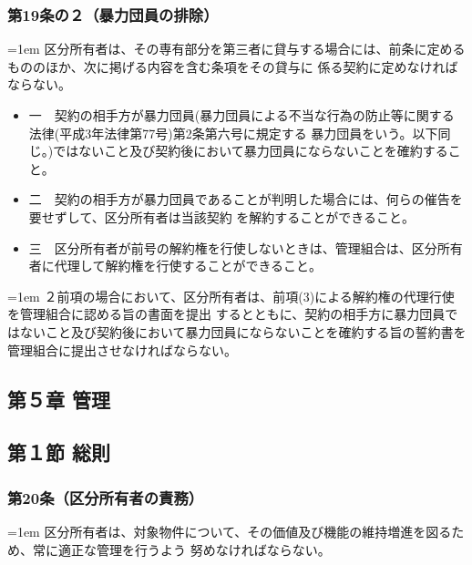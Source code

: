 \documentclass[
  twoside,
  luatex,
  paper=a4paper,
  fontsize=11pt,
  jafontsize=11pt,
  jlreq_notes,
]{jlreq}
\newcommand{\joumain}[1]{%
  \noindent\hangindent=1em\hangafter=1
  \hspace{1em}#1%
}
\newcommand{\kou}[2]{%
  \par\noindent\hangindent=1em\hangafter=1
  #1\hspace{1em}#2%
}
\begin{document}
  \subsubsection*{第19条の２（暴力団員の排除）}
  \joumain{区分所有者は、その専有部分を第三者に貸与する場合には、前条に定めるもののほか、次に掲げる内容を含む条項をその貸与に
  係る契約に定めなければならない。}
  \begin{itemize}[label={}, leftmargin=3em, itemindent=-2em]
    \item 一　契約の相手方が暴力団員(暴力団員による不当な行為の防止等に関する法律(平成3年法律第77号)第2条第六号に規定する
    暴力団員をいう。以下同じ。)ではないこと及び契約後において暴力団員にならないことを確約すること。
    \item 二　契約の相手方が暴力団員であることが判明した場合には、何らの催告を要せずして、区分所有者は当該契約
    を解約することができること。
    \item 三　区分所有者が前号の解約権を行使しないときは、管理組合は、区分所有者に代理して解約権を行使することができること。
    \end{itemize}
  \kou{２}{前項の場合において、区分所有者は、前項(3)による解約権の代理行使を管理組合に認める旨の書面を提出
  するとともに、契約の相手方に暴力団員ではないこと及び契約後において暴力団員にならないことを確約する旨の誓約書を
  管理組合に提出させなければならない。}
  
  \begin{center}
  \subsection*{第５章 管理}
  \subsection*{第１節 総則}
  \end{center}

  \subsubsection*{第20条（区分所有者の責務）}
  \joumain{区分所有者は、対象物件について、その価値及び機能の維持増進を図るため、常に適正な管理を行うよう
  努めなければならない。}
\end{document}
